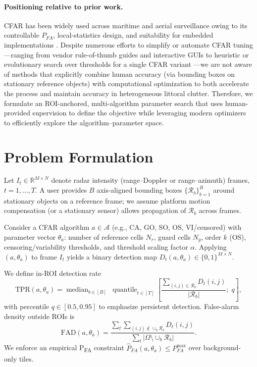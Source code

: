 \documentclass[conf]{new-aiaa}
\begin{document}
\paragraph{Positioning relative to prior work.} CFAR has been widely used across maritime and aerial surveillance owing to its controllable $P_{FA}$, local-statistics design, and suitability for embedded implementations \cite{farina2005review,gandhi1988,ward2006}. Despite numerous efforts to simplify or automate CFAR tuning—ranging from vendor rule-of-thumb guides and interactive GUIs to heuristic or evolutionary search over thresholds for a single CFAR variant \cite{mathworksCFAR,katzlberger2018,zenodoRTOSCFAR}—we are not aware of methods that explicitly combine human accuracy (via bounding boxes on stationary reference objects) with computational optimization to both accelerate the process and maintain accuracy in heterogeneous littoral clutter. Therefore, we formulate an ROI-anchored, multi-algorithm parameter search that uses human-provided supervision to define the objective while leveraging modern optimizers to efficiently explore the algorithm–parameter space.

\section{Problem Formulation}
Let \(I_t \in \mathbb{R}^{M\times N}\) denote radar intensity (range--Doppler or range--azimuth) frames, \(t = 1,\dots,T\). A user provides \(B\) axis-aligned bounding boxes \(\{\mathcal{R}_b\}_{b=1}^B\) around stationary objects on a reference frame; we assume platform motion compensation (or a stationary sensor) allows propagation of \(\mathcal{R}_b\) across frames.

Consider a CFAR algorithm \(a\in\mathcal{A}\) (e.g., CA, GO, SO, OS, VI/censored) with parameter vector \(\theta_a\): number of reference cells \(N_r\), guard cells \(N_g\), order \(k\) (OS), censoring/variability thresholds, and threshold scaling factor \(\alpha\). Applying \((a,\theta_a)\) to frame \(I_t\) yields a binary detection map \(D_t(a,\theta_a)\in\{0,1\}^{M\times N}\).

We define in-ROI detection rate
\begin{equation}
\mathrm{TPR}(a,\theta_a) 
= \operatorname{median}_{b\in [B]}\;\operatorname{quantile}_{t\in[T]}\left[ \frac{\sum_{(i,j)\in\mathcal{R}_b} D_t(i,j)}{|\mathcal{R}_b|} ;\; q\right],
\end{equation}
with percentile \(q\in[0.5,0.95]\) to emphasize persistent detection. False-alarm density outside ROIs is
\begin{equation}
\mathrm{FAD}(a,\theta_a)=\frac{\sum_{t}\sum_{(i,j)\notin\cup_b \mathcal{R}_b} D_t(i,j)}{\sum_{t} |\Omega\setminus\cup_b \mathcal{R}_b|}.
\end{equation}
We enforce an empirical P\textsubscript{FA} constraint \(\widehat{P}_{FA}(a,\theta_a)\le P_{FA}^{\max}\) over background-only tiles.
\end{document}

